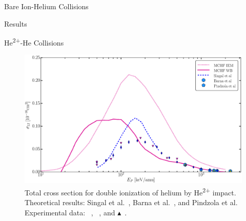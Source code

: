 \documentclass[letterpaper, 11 pt]{report}
\begin{document}
\begin{chapter}{Bare Ion-Helium Collisions \label{chap:p-he2p-he}}
\begin{section}{Results \label{sec:phe2p-res}}
\begin{subsection}{\texorpdfstring{He\textsuperscript{2+}}{He2+}-He Collisions
                         \label{sec:he2phe-res}}
         \begin{figure}[t]
            \centering
            \includegraphics[width = 0.95 \linewidth]{./images/he2phe/he2phe-II.eps}
            \caption[Total cross section for double ionization of helium by He\textsuperscript{2+}
                     impact.]{Total cross section for double ionization of helium by
                     He\textsuperscript{2+} impact. Theoretical results: Singal
                     et al.~\cite{SL-91}, Barna
                     et al.~\cite{BTB-05}, and Pindzola et al.~\cite{PRC-07}
                     Experimental data: {\color{blue}{$\blacklozenge$}}~\cite{SG85},
                     {\color{RedViolet}{$\blacktriangledown$}}~\cite{Dubois87}, and
                     {\color{GreenYellow}$\blacktriangle$}~\cite{KAH84}. \label{fig:he2phe-ii}}
         \end{figure}


\end{subsection}
\end{section}
\end{chapter}
\end{document}
